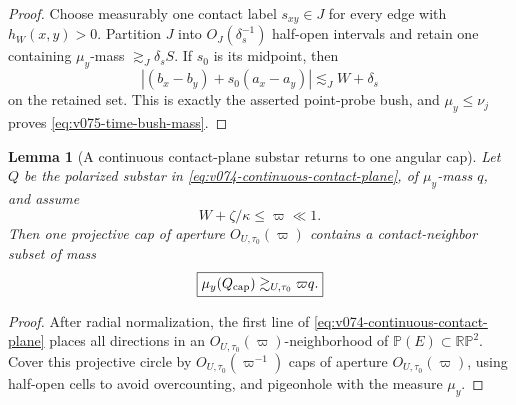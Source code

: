 \documentclass[10pt]{article}
\newtheorem{lemma}[theorem]{Lemma}
\begin{document}
\begin{proof}
Choose measurably one contact label \(s_{xy}\in J\) for every edge with \(h_W(x,y)>0\).
Partition \(J\) into \(O_J(\delta_s^{-1})\) half-open intervals and retain one containing
\(\mu_y\)-mass \(\gtrsim_J\delta_sS\).  If \(s_0\) is its midpoint, then
\[
|(b_x-b_y)+s_0(a_x-a_y)|
\lesssim_J W+\delta_s
\]
on the retained set.  This is exactly the asserted point-probe bush, and
\(\mu_y\le\nu_j\) proves \eqref{eq:v075-time-bush-mass}.
\end{proof}

\begin{lemma}[A continuous contact-plane substar returns to one angular cap]
\label{lem:v075-continuous-plane-angular}
Let \(Q\) be the polarized substar in
\eqref{eq:v074-continuous-contact-plane}, of \(\mu_y\)-mass \(q\), and assume
\[
W+\zeta/\kappa\le\varpi\ll1.
\]
Then one projective cap of aperture \(O_{U,\tau_0}(\varpi)\) contains a contact-neighbor subset of
mass
\begin{equation}
\label{eq:v075-plane-angular-mass}
\boxed{
\mu_y(Q_{\rm cap})
\gtrsim_{U,\tau_0}
\varpi q.
}
\end{equation}
\end{lemma}

\begin{proof}
After radial normalization, the first line of
\eqref{eq:v074-continuous-contact-plane} places all directions in an
\(O_{U,\tau_0}(\varpi)\)-neighborhood of
\(\mathbb P(E)\subset\mathbb{RP}^2\).  Cover this projective circle by
\(O_{U,\tau_0}(\varpi^{-1})\) caps of aperture \(O_{U,\tau_0}(\varpi)\), using half-open cells to
avoid overcounting, and pigeonhole with the measure \(\mu_y\).
\end{proof}
\end{document}
